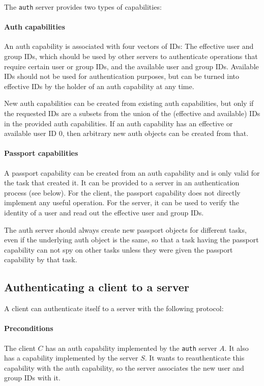 \documentclass[9pt,a4paper]{extarticle}
\begin{document}
The \texttt{auth} server provides two types of capabilities:

\paragraph{Auth capabilities}
An auth capability is associated with four vectors of IDs: The
effective user and group IDs, which should be used by other servers to
authenticate operations that require certain user or group IDs, and
the available user and group IDs.  Available IDs should not be used
for authentication purposes, but can be turned into effective IDs by
the holder of an auth capability at any time.

New auth capabilities can be created from existing auth capabilities,
but only if the requested IDs are a subsets from the union of the
(effective and available) IDs in the provided auth capabilities.  If
an auth capability has an effective or available user ID 0, then
arbitrary new auth objects can be created from that.

\paragraph{Passport capabilities}
A passport capability can be created from an auth capability and is
only valid for the task that created it.  It can be provided to a
server in an authentication process (see below).  For the client, the
passport capability does not directly implement any useful operation.
For the server, it can be used to verify the identity of a user and
read out the effective user and group IDs.

The auth server should always create new passport objects for
different tasks, even if the underlying auth object is the same, so
that a task having the passport capability can not spy on other tasks
unless they were given the passport capability by that task.

\subsection{Authenticating a client to a server}

A client can authenticate itself to a server with the following
protocol:

\paragraph{Preconditions}
The client $C$ has an auth capability implemented by the \texttt{auth}
server $A$.  It also has a capability implemented by the server $S$.
It wants to reauthenticate this capability with the auth capability,
so the server associates the new user and group IDs with it.
\end{document}
